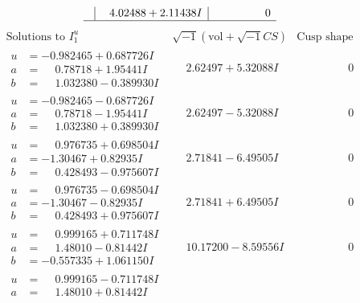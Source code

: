 \documentclass[1p]{elsarticle_modified}
\theoremstyle{definition}
\newcommand{\I}{\sqrt{-1}}
\begin{document}
$$\begin{array}{c|c|c}
 & \phantom{-}4.02488 + 2.11438 I & \phantom{-0.000000 } 0\\
 \hline 
 \end{array}$$\newpage$$\begin{array}{c|c|c}  
\text{Solutions to }I^u_{1}& \I (\text{vol} + \sqrt{-1}CS) & \text{Cusp shape}\\
 \hline 
\begin{aligned}
u &= -0.982465 + 0.687726 I \\
a &= \phantom{-}0.78718 + 1.95441 I \\
b &= \phantom{-}1.032380 - 0.389930 I\end{aligned}
 & \phantom{-}2.62497 + 5.32088 I & \phantom{-0.000000 } 0 \\ \hline\begin{aligned}
u &= -0.982465 - 0.687726 I \\
a &= \phantom{-}0.78718 - 1.95441 I \\
b &= \phantom{-}1.032380 + 0.389930 I\end{aligned}
 & \phantom{-}2.62497 - 5.32088 I & \phantom{-0.000000 } 0 \\ \hline\begin{aligned}
u &= \phantom{-}0.976735 + 0.698504 I \\
a &= -1.30467 + 0.82935 I \\
b &= \phantom{-}0.428493 - 0.975607 I\end{aligned}
 & \phantom{-}2.71841 - 6.49505 I & \phantom{-0.000000 } 0 \\ \hline\begin{aligned}
u &= \phantom{-}0.976735 - 0.698504 I \\
a &= -1.30467 - 0.82935 I \\
b &= \phantom{-}0.428493 + 0.975607 I\end{aligned}
 & \phantom{-}2.71841 + 6.49505 I & \phantom{-0.000000 } 0 \\ \hline\begin{aligned}
u &= \phantom{-}0.999165 + 0.711748 I \\
a &= \phantom{-}1.48010 - 0.81442 I \\
b &= -0.557335 + 1.061150 I\end{aligned}
 & \phantom{-}10.17200 - 8.59556 I & \phantom{-0.000000 } 0 \\ \hline\begin{aligned}
u &= \phantom{-}0.999165 - 0.711748 I \\
a &= \phantom{-}1.48010 + 0.81442 I \\

\end{aligned}
\end{array}$$
\end{document}

